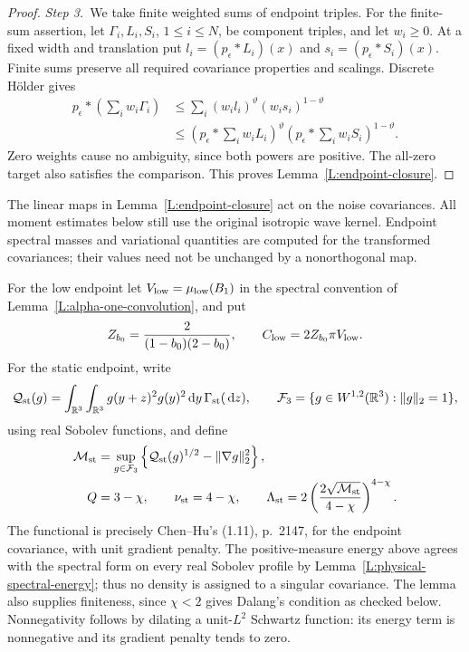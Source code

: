 \documentclass[12pt,oneside,openany]{book}
\numberwithin{equation}{section}
\theoremstyle{nogostyle}
\theoremstyle{definition}
\newcommand{\R}{\mathbb{R}}
\newcommand{\ud}{\,\mathrm{d}}
\begin{document}
\begin{proof}
  \medskip
  \noindent\textit{Step 3.~}We take finite weighted sums of endpoint triples.
  For the finite-sum assertion, let $\Gamma_i,L_i,S_i$, $1 \le i \le N$, be
  component triples, and let $w_i \ge 0$. At a fixed width and translation put
  $l_i = (p_\epsilon*L_i)(x)$ and $s_i = (p_\epsilon*S_i)(x)$. Finite sums
  preserve all required covariance properties and scalings. Discrete H\"older
  gives
  \[
    \begin{split}
      p_\epsilon*\left(\sum_iw_i\Gamma_i\right)
      &\le\sum_i(w_il_i)^\vartheta(w_is_i)^{1-\vartheta}\\
      &\le\left(p_\epsilon*\sum_iw_iL_i\right)^\vartheta
      \left(p_\epsilon*\sum_iw_iS_i\right)^{1-\vartheta}.
    \end{split}
  \]
  Zero weights cause no ambiguity, since both powers are positive. The all-zero
  target also satisfies the comparison. This proves
  Lemma~\ref{L:endpoint-closure}.
\end{proof}

The linear maps in Lemma~\ref{L:endpoint-closure} act on the noise covariances.
All moment estimates below still use the original isotropic wave kernel.
Endpoint spectral masses and variational quantities are computed for the
transformed covariances; their values need not be unchanged by a nonorthogonal
map.

For the low endpoint let $V_{\rm low} = \mu_{\rm low}(B_1)$ in the spectral
convention of Lemma~\ref{L:alpha-one-convolution}, and put
\[
  Z_{b_0}=\frac2{(1-b_0)(2-b_0)},\qquad
  C_{\rm low}=2Z_{b_0}\pi V_{\rm low}.
\]
For the static endpoint, write
\[
  \mathcal{Q}_{\rm st}(g)
  =\int_{\R^3}\int_{\R^3}g(y+z)^2g(y)^2\ud y
  \,\Gamma_{\rm st}(\ud z),\qquad
  \mathcal{F}_3=\{g\in W^{1,2}(\R^3):\|g\|_2=1\},
\]
using real Sobolev functions, and define
\begin{equation}\label{E:three-static-variational}
  \begin{split}
    \mathcal{M}_{\rm st}
    &=\sup_{g\in\mathcal{F}_3}
    \left\{\mathcal{Q}_{\rm st}(g)^{1/2}-\|\nabla g\|_2^2\right\},\\
    Q&=3-\chi,\qquad \nu_{\rm st}=4-\chi,\qquad
    \Lambda_{\rm st}
    =2\left(\frac{2\sqrt{\mathcal{M}_{\rm st}}}{4-\chi}\right)^{4-\chi}.
  \end{split}
\end{equation}
The functional is precisely Chen--Hu's (1.11), p.~2147, for the endpoint
covariance, with unit gradient penalty. The positive-measure energy above agrees
with the spectral form on every real Sobolev profile by
Lemma~\ref{L:physical-spectral-energy}; thus no density is assigned to a
singular covariance. The lemma also supplies finiteness, since $\chi < 2$ gives
Dalang's condition as checked below. Nonnegativity follows by dilating a
unit-$L^2$ Schwartz function: its energy term is nonnegative and its gradient
penalty tends to zero.
\end{document}
